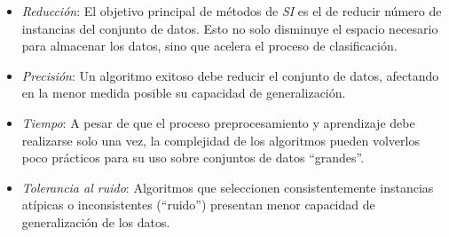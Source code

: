 \begin{itemize}
\item \emph{Reducción}: El objetivo principal de métodos de \emph{SI} es el de reducir número de instancias del conjunto de datos. Esto no solo disminuye el espacio necesario para almacenar los datos, sino que acelera el proceso de clasificación.
\item \emph{Precisión}: Un algoritmo exitoso debe reducir el conjunto de datos, afectando en la menor medida posible su capacidad de generalización.
\item \emph{Tiempo}: A pesar de que el proceso preprocesamiento y aprendizaje debe realizarse solo una vez, la complejidad de los algoritmos pueden volverlos poco prácticos para su uso sobre conjuntos de datos ``grandes''.
\item \emph{Tolerancia al ruido}: Algoritmos que seleccionen consistentemente instancias atípicas o inconsistentes (``ruido'') presentan menor capacidad de generalización de los datos.
\end{itemize}

